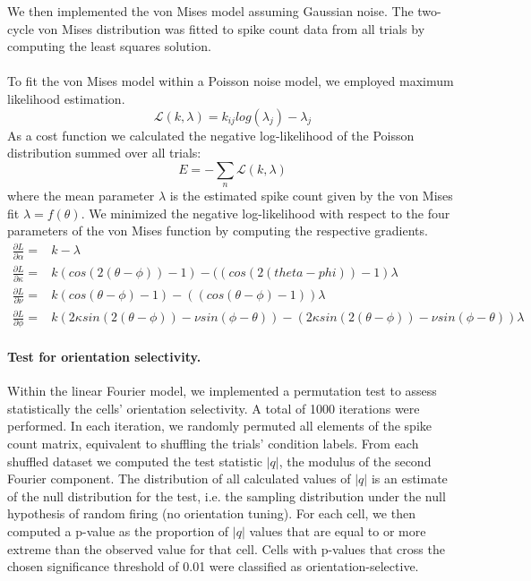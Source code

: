 \documentclass[10pt]{article}
\begin{document}

We then implemented the von Mises model assuming Gaussian noise. The two-cycle von Mises distribution was fitted to spike count data from all trials by computing the least squares solution. \\ \\
To fit the von Mises model within a Poisson noise model, we employed maximum likelihood estimation. 
\begin{equation*}
\mathcal{L}(k,\lambda) = k_{ij}log(\lambda_j)-\lambda_j
\end{equation*}
As a cost function we calculated the negative log-likelihood of the Poisson distribution summed over all trials: 
\begin{equation}
E = - \sum_n \mathcal{L}(k,\lambda)
\end{equation}
where the mean parameter $\lambda$ is the estimated spike count given by the von Mises fit $\lambda = f(\theta)$. We minimized the negative log-likelihood with respect to the four parameters of the von Mises function by computing the respective gradients.
\begin{align*}
 \frac{\partial L}{\partial \alpha} = &k - \lambda  \\
 \frac{\partial L}{\partial \kappa} = &k(cos(2(\theta-\phi))-1) - ((cos(2(theta-phi))-1) \lambda \\
 \frac{\partial L}{\partial \nu} = &k(cos(\theta-\phi)-1) - ((cos(\theta-\phi)-1)) \lambda \\
 \frac{\partial L}{\partial \phi} =  & k(2\kappa sin(2(\theta-\phi)) - \nu sin(\phi-\theta)) -(2\kappa sin(2(\theta-\phi))- \nu sin(\phi-\theta)) \lambda
\end{align*}
\paragraph{Test for orientation selectivity.} Within the linear Fourier model, we implemented a permutation test to assess statistically the cells' orientation selectivity. A total of 1000 iterations were performed. In each iteration, we randomly permuted all elements of the spike count matrix, equivalent to shuffling the trials' condition labels. From each shuffled dataset we computed the test statistic $|q|$, the modulus of the second Fourier component. The distribution of all calculated values of $|q|$ is an estimate of the null distribution for the test, i.e. the sampling distribution under the null hypothesis of random firing (no orientation tuning). For each cell, we then computed a p-value as the proportion of $|q|$ values that are equal to or more extreme than the observed value for that cell. Cells with p-values that cross the chosen significance threshold of 0.01 were classified as orientation-selective.
\end{document}
